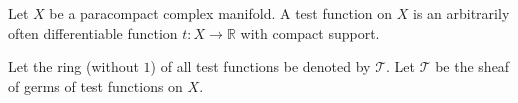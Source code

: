 Let $X$ be a paracompact complex manifold. A test function on $X$ is an arbitrarily often differentiable function $t: X \to \mathbb{R}$ with compact support.

Let the ring (without $1$) of all test functions be denoted by $\mathcal{T}$. Let $\mathcal{T}$ be the sheaf of germs of test functions on $X$.
